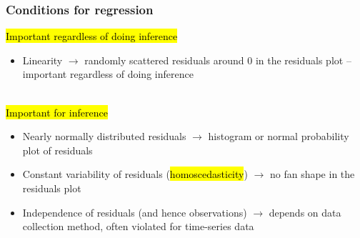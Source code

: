 \documentclass[slidestop,compress,mathserif,12pt,t,professionalfonts,xcolor=table]{beamer}
\begin{document}
\begin{frame}
\frametitle{Conditions for regression}
{\small
\hl{Important regardless of doing inference}

\begin{itemize}

\item Linearity $\rightarrow$ randomly scattered residuals around 0 in the residuals plot -- important regardless of doing inference

\end{itemize}

\pause

$\:$ \\

\hl{Important for inference}

\begin{itemize}

\item Nearly normally distributed residuals $\rightarrow$ histogram or normal probability plot of residuals

\pause

\item Constant variability of residuals (\hl{homoscedasticity}) $\rightarrow$ no fan shape in the residuals plot

\pause

\item Independence of residuals (and hence observations) $\rightarrow$ depends on data collection method, often violated for time-series data

\end{itemize}
}
\end{frame}

\end{document}

